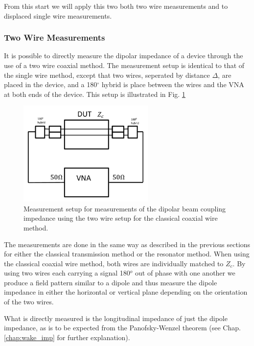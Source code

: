 From this start we will apply this two both two wire measurements and to displaced single wire measurements.

\subsubsection{Two Wire Measurements}

It is possible to directly measure the dipolar impedance of a device through the use of a two wire coaxial method. The measurement setup is identical to that of the single wire method, except that two wires, seperated by distance $\Delta$, are placed in the device, and a 180$^{\circ}$ hybrid is place between the wires and the VNA at both ends of the device. This setup is illustrated in Fig. \ref{fig:two_wire_measure}

\begin{figure}
\begin{center}
\includegraphics[width=0.6\textwidth]{Bench_Top_Measurements/figures/wire_meas_two_wire.pdf}
\end{center}
\label{fig:two_wire_measure}
\caption{Measurement setup for measurements of the dipolar beam coupling impedance using the two wire setup for the classical coaxial wire method.}
\end{figure}

The measurements are done in the same way as described in the previous sections for either the classical transmission method or the resonator method. When using the classical coaxial wire method, both wires are individually matched to $Z_{c}$. By using two wires each carrying a signal 180$^{o}$ out of phase with one another we produce a field pattern similar to a dipole and thus measure the dipole impedance in either the horizontal or vertical plane depending on the orientation of the two wires. 

What is directly measured is the longitudinal impedance of just the dipole impedance, as is to be expected from the Panofsky-Wenzel theorem (see Chap. \ref{chap:wake_imp} for further explanation). 

